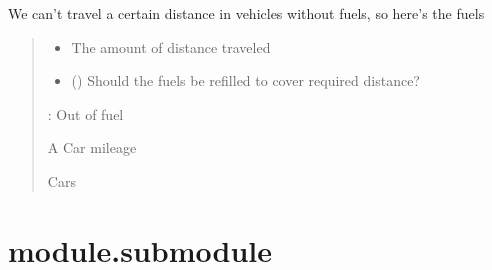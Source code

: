 \documentclass[letterpaper,10pt,english]{sphinxmanual}
\begin{document}
\begin{fulllineitems}
\begin{fulllineitems}
\label{\detokenize{_autosummary/module.dummycode.SphinxVehicle:module.dummycode.SphinxVehicle.cars}}
\pysigstartsignatures
{}
\pysigstopsignatures
\sphinxAtStartPar
We can’t travel a certain distance in vehicles without fuels, so here’s the fuels
\begin{quote}\begin{description}
\begin{itemize}
\item {} 
\sphinxAtStartPar
{} \textendash{} The amount of distance traveled

\item {} 
\sphinxAtStartPar
{} () \textendash{} Should the fuels be refilled to cover required distance?

\end{itemize}

\sphinxAtStartPar
{}: Out of fuel

\sphinxAtStartPar
A Car mileage

\sphinxAtStartPar
Cars

\end{description}\end{quote}

\end{fulllineitems}


\end{fulllineitems}


\sphinxstepscope


\section{module.submodule}
\label{\detokenize{_autosummary/module.submodule:module-module.submodule}}\label{\detokenize{_autosummary/module.submodule:module-submodule}}\label{\detokenize{_autosummary/module.submodule::doc}}
\end{document}
